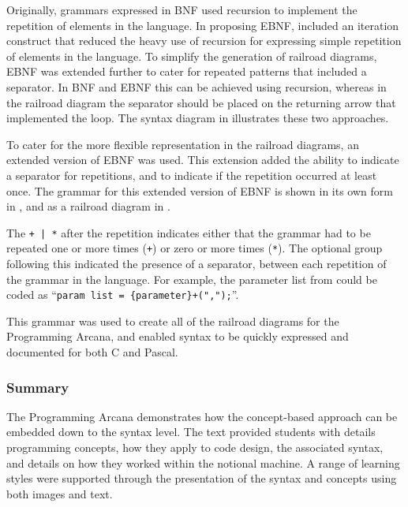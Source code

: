 Originally, grammars expressed in BNF used recursion to implement the repetition of elements in the language. In proposing EBNF, \cite{Wirth:1977} included an iteration construct that reduced the heavy use of recursion for expressing simple repetition of elements in the language. To simplify the generation of railroad diagrams, EBNF was extended further to cater for repeated patterns that included a separator. In BNF and EBNF this can be achieved using recursion, whereas in the railroad diagram the separator should be placed on the returning arrow that implemented the loop. The syntax diagram in  illustrates these two approaches. 


To cater for the more flexible representation in the railroad diagrams, an extended version of EBNF was used. This extension added the ability to indicate a separator for repetitions, and to indicate if the repetition occurred at least once. The grammar for this extended version of EBNF is shown in its own form in , and as a railroad diagram in .



The \texttt{+ | *} after the repetition indicates either that the grammar had to be repeated one or more times (\texttt{+}) or zero or more times (\texttt{*}). The optional group following this indicated the presence of a separator, between each repetition of the grammar in the language. For example, the parameter list from  could be coded as ``\texttt{param list = \{parameter\}+(",");}''.

This grammar was used to create all of the railroad diagrams for the Programming Arcana, and enabled syntax to be quickly expressed and documented for both C and Pascal.


\subsubsection{Summary} %
\label{ssub:arcana_summary}

The Programming Arcana demonstrates how the concept-based approach can be embedded down to the syntax level. The text provided students with details programming concepts, how they apply to code design, the associated syntax, and details on how they worked within the notional machine. A range of learning styles were supported through the presentation of the syntax and concepts using both images and text. 

